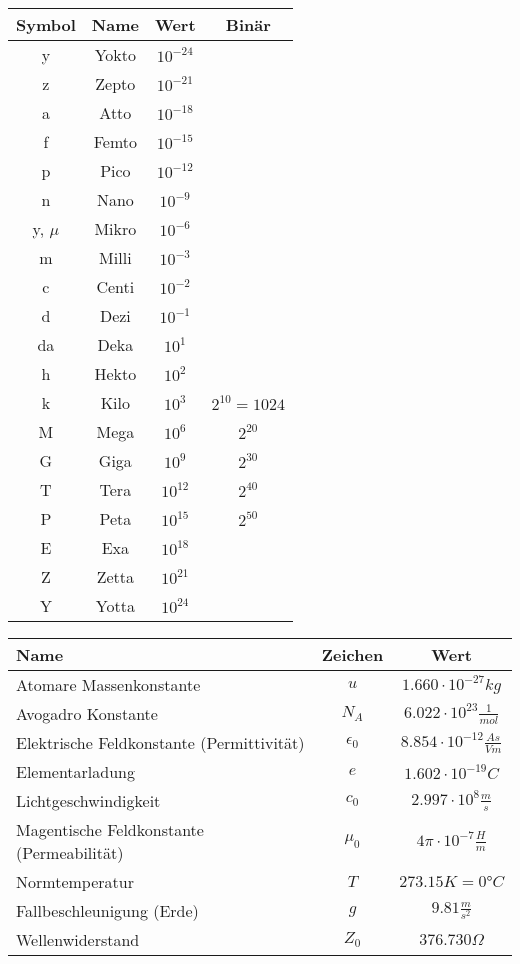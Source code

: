 \begin{multicols}{2}
		\begin{tabular}{|c|c|c|c|}
			\hline \textbf{Symbol} & \textbf{Name} & \textbf{Wert} & \textbf{Binär}\\
			\hline y 	& Yokto & $10^{-24}$ &  \\
			\hline z 	& Zepto & $10^{-21}$ &  \\
			\hline a 	& Atto & $10^{-18}$ &  \\
			\hline f 	& Femto & $10^{-15}$ & \\
			\hline p 	& Pico & $10^{-12}$ & \\
			\hline n 	& Nano & $10^{-9}$ & \\
			\hline y, $\mu$ & Mikro & $10^{-6}$ & \\
			\hline m 	& Milli	& $10^{-3}$ & \\
			\hline c	& Centi	& $10^{-2}$ &\\ 
			\hline d	& Dezi	& $10^{-1}$ &\\
			\hline da	& Deka 	& $10^1$ & \\
			\hline h	& Hekto & $10^2$ & \\ 
			\hline k	& Kilo	& $10^3$ & $2^{10} = 1024$ \\
			\hline M	& Mega	& $10^6$ & $2^{20}$\\
			\hline G	& Giga  & $10^9$ & $2^{30}$\\
			\hline T	& Tera	& $10^{12}$ & $2^{40}$ \\
			\hline P	& Peta	& $10^{15}$ & $2^{50}$\\
			\hline E 	& Exa	& $10^{18}$ & \\
			\hline Z 	& Zetta & $10^{21}$ &  \\
			\hline Y 	& Yotta & $10^{24}$ &  \\
			\hline
		\end{tabular}
		
\end{multicols}
\vspace{0.3cm}
\renewcommand{\arraystretch}{1.2}
\begin{tabular}{|l|c|c|}
	\hline \textbf{Name} & \textbf{Zeichen} & \textbf{Wert}\\
	\hline Atomare Massenkonstante & $u$ & $1.660 \cdot 10^{-27} kg$\\
	\hline Avogadro Konstante & $N_A$ & $6.022 \cdot 10^{23} \frac{1}{mol}$\\
	\hline Elektrische Feldkonstante (Permittivität) & $\epsilon_0$ & $8.854 \cdot 10^{-12} \frac{As}{Vm}$\\
	\hline Elementarladung &$e$ & $1.602 \cdot 10^{-19} C$\\
	\hline Lichtgeschwindigkeit &$c_0$ &$2.997 \cdot 10^{8} \frac{m}{s}$\\
	\hline Magentische Feldkonstante (Permeabilität)&$\mu_0$ &$4\pi \cdot 10^{-7} \frac{H}{m}$\\
	\hline Normtemperatur & $T$ & $273.15K = 0°C$\\
	\hline Fallbeschleunigung (Erde) &$g$ &$9.81 \frac{m}{s^2}$\\
	\hline Wellenwiderstand &$Z_0$ &$376.730 \Omega$\\ 
	\hline
\end{tabular}






